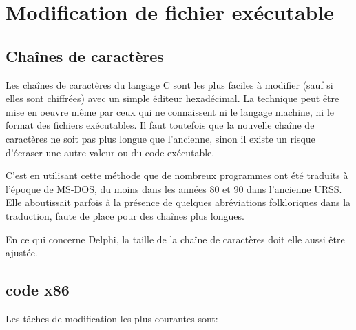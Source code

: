 ﻿\section{Modification de fichier exécutable}

\subsection{Chaînes de caractères}

Les chaînes de caractères du langage C sont les plus faciles à modifier (sauf si elles sont chiffrées)
avec un simple éditeur hexadécimal. La technique peut être mise en oeuvre même par ceux qui ne
connaissent ni le langage machine, ni le format des fichiers exécutables.
Il faut toutefois que la nouvelle chaîne de caractères ne soit pas plus longue que l'ancienne, sinon 
il existe un risque d'écraser une autre valeur ou du code exécutable.


C'est en utilisant cette méthode que de nombreux programmes ont été traduits à l'époque de MS-DOS,
du moins dans les années 80 et 90 dans l'ancienne URSS. Elle aboutissait parfois à la présence de quelques abréviations folkloriques dans la traduction, faute de place pour des chaînes plus longues.


En ce qui concerne Delphi, la taille de la chaîne de caractères doit elle aussi être ajustée.

\subsection{code x86}
\label{x86_patching}

Les tâches de modification les plus courantes sont:

